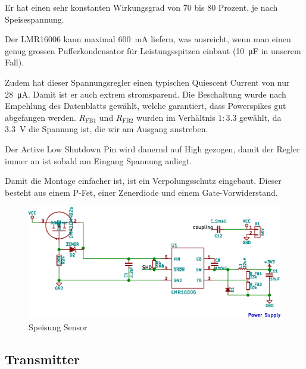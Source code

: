 Er  hat einen  sehr konstanten  Wirkungsgrad von  70 bis  80 Prozent,  je nach
Speisespannung.

Der LMR16006 kann maximal \SI{600}{\milli\ampere} liefern, was ausreicht, wenn
man  einen  genug  grossen Pufferkondensator  f\"ur  Leistungsspitzen  einbaut
(\SI{10}{\micro\farad} in unserem Fall).

Zudem  hat  dieser  Spannungsregler  einen  typischen  Quiescent  Current  von
nur  \SI{28}{\micro\ampere}. Damit  ist  er  auch  extrem  stromsparend.   Die
Beschaltung  wurde  nach   Empehlung  des  Datenblatts  \cite{ref:ti:lmr16006}
gew\"ahlt,  welche   garantiert,  dass  Powerspikes  gut   abgefangen  werden.
$R_{\mathrm{FB1}}$  und  $R_{\mathrm{FB2}}$  wurden  im  Verh\"altnis  $1:3.3$
gew\"ahlt, da \SI{3.3}{\volt} die Spannung ist, die wir am Ausgang anstreben.

Der Active  Low Shutdown Pin wird  dauernd auf High gezogen,  damit der Regler
immer an ist sobald am Eingang Spannung anliegt.

Damit die  Montage einfacher  ist, ist ein  Verpolungsschutz eingebaut. Dieser
besteht aus einem P-Fet, einer Zenerdiode und einem Gate-Vorwiderstand.

\vspace*{2em}

\begin{figure}[h!t]
    \centering
    \includegraphics[width=1\textwidth]{images/sensor-sch/sensor--sch--supply.eps}
    \caption[Sensor: Schema Speisung]{Speisung Sensor}
\end{figure}


\clearpage
\subsection{Transmitter}
\label{subsec:hw:sensor:transmitter}

